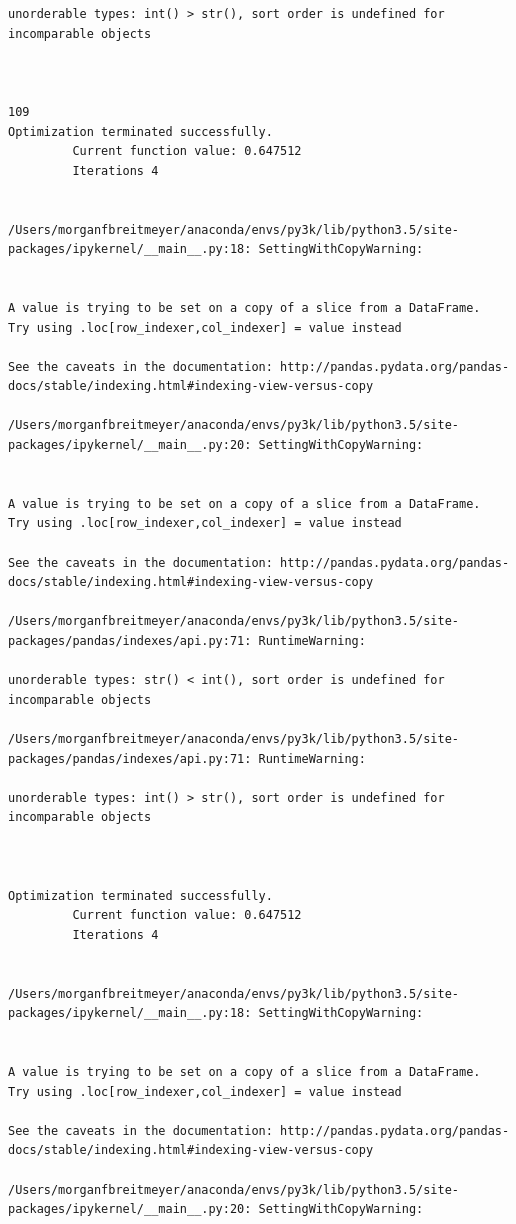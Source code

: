 \begin{lstlisting}
unorderable types: int() > str(), sort order is undefined for incomparable objects



109
Optimization terminated successfully.
         Current function value: 0.647512
         Iterations 4


/Users/morganfbreitmeyer/anaconda/envs/py3k/lib/python3.5/site-packages/ipykernel/__main__.py:18: SettingWithCopyWarning:


A value is trying to be set on a copy of a slice from a DataFrame.
Try using .loc[row_indexer,col_indexer] = value instead

See the caveats in the documentation: http://pandas.pydata.org/pandas-docs/stable/indexing.html#indexing-view-versus-copy

/Users/morganfbreitmeyer/anaconda/envs/py3k/lib/python3.5/site-packages/ipykernel/__main__.py:20: SettingWithCopyWarning:


A value is trying to be set on a copy of a slice from a DataFrame.
Try using .loc[row_indexer,col_indexer] = value instead

See the caveats in the documentation: http://pandas.pydata.org/pandas-docs/stable/indexing.html#indexing-view-versus-copy

/Users/morganfbreitmeyer/anaconda/envs/py3k/lib/python3.5/site-packages/pandas/indexes/api.py:71: RuntimeWarning:

unorderable types: str() < int(), sort order is undefined for incomparable objects

/Users/morganfbreitmeyer/anaconda/envs/py3k/lib/python3.5/site-packages/pandas/indexes/api.py:71: RuntimeWarning:

unorderable types: int() > str(), sort order is undefined for incomparable objects



Optimization terminated successfully.
         Current function value: 0.647512
         Iterations 4


/Users/morganfbreitmeyer/anaconda/envs/py3k/lib/python3.5/site-packages/ipykernel/__main__.py:18: SettingWithCopyWarning:


A value is trying to be set on a copy of a slice from a DataFrame.
Try using .loc[row_indexer,col_indexer] = value instead

See the caveats in the documentation: http://pandas.pydata.org/pandas-docs/stable/indexing.html#indexing-view-versus-copy

/Users/morganfbreitmeyer/anaconda/envs/py3k/lib/python3.5/site-packages/ipykernel/__main__.py:20: SettingWithCopyWarning:



\end{lstlisting}
